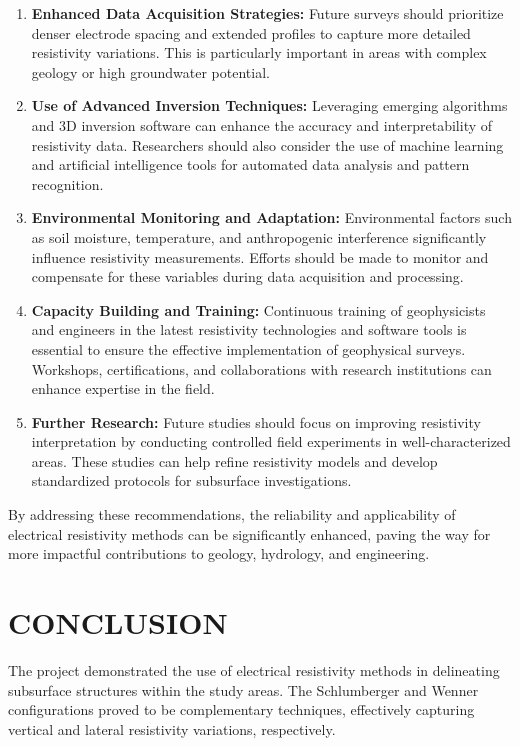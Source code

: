 \documentclass[12pt,a4paper]{report}
\begin{document}
\begin{enumerate}    
    \item \textbf{Enhanced Data Acquisition Strategies:} Future surveys should prioritize denser electrode spacing and extended profiles to capture more detailed resistivity variations. This is particularly important in areas with complex geology or high groundwater potential.
    
    \item \textbf{Use of Advanced Inversion Techniques:} Leveraging emerging algorithms and 3D inversion software can enhance the accuracy and interpretability of resistivity data. Researchers should also consider the use of machine learning and artificial intelligence tools for automated data analysis and pattern recognition.
    
    \item \textbf{Environmental Monitoring and Adaptation:} Environmental factors such as soil moisture, temperature, and anthropogenic interference significantly influence resistivity measurements. Efforts should be made to monitor and compensate for these variables during data acquisition and processing.
    
    \item \textbf{Capacity Building and Training:} Continuous training of geophysicists and engineers in the latest resistivity technologies and software tools is essential to ensure the effective implementation of geophysical surveys. Workshops, certifications, and collaborations with research institutions can enhance expertise in the field.
     
    \item \textbf{Further Research:} Future studies should focus on improving resistivity interpretation by conducting controlled field experiments in well-characterized areas. These studies can help refine resistivity models and develop standardized protocols for subsurface investigations.
\end{enumerate}

By addressing these recommendations, the reliability and applicability of electrical resistivity methods can be significantly enhanced, paving the way for more impactful contributions to geology, hydrology, and engineering.

\section{CONCLUSION}

The project demonstrated the use of electrical resistivity methods in delineating subsurface structures within the study areas. The Schlumberger and Wenner configurations proved to be complementary techniques, effectively capturing vertical and lateral resistivity variations, respectively.
\end{document}
